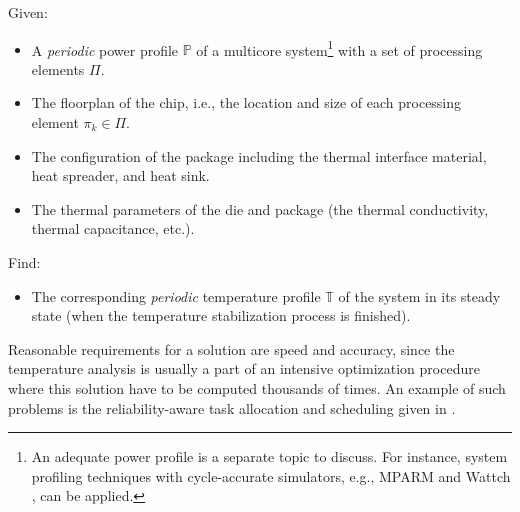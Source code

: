 Given:
\begin{itemize}
  \item A \emph{periodic} power profile $\mathbb{P}$ of a multicore system\footnote{An adequate power profile is a separate topic to discuss. For instance, system profiling techniques with cycle-accurate simulators, e.g., MPARM \cite{benini2005} and Wattch \cite{brooks2000}, can be applied.} with a set of processing elements $\Pi$.
  \item The floorplan of the chip, i.e., the location and size of each processing element $\pi_k \in \Pi$.
  \item The configuration of the package including the thermal interface material, heat spreader, and heat sink.
  \item The thermal parameters of the die and package (the thermal conductivity, thermal capacitance, etc.).
\end{itemize}

Find:
\begin{itemize}
  \item The corresponding \emph{periodic} temperature profile $\mathbb{T}$ of the system in its steady state (when the temperature stabilization process is finished).
\end{itemize}

Reasonable requirements for a solution are speed and accuracy, since the temperature analysis is usually a part of an intensive optimization procedure where this solution have to be computed thousands of times. An example of such problems is the reliability-aware task allocation and scheduling given in .
